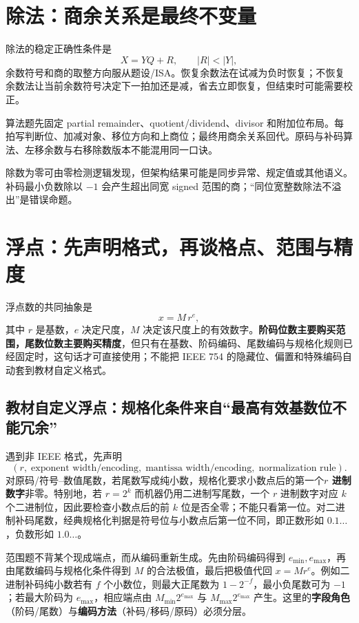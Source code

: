 \documentclass[UTF8,fontset=fandol,11pt,a4paper]{ctexart}
\newcommand{\kw}[1]{\textbf{\color{deep}#1}}
\begin{document}
\begin{center}

\end{center}

\section{除法：商余关系是最终不变量}
除法的稳定正确性条件是
\[
X=YQ+R,\qquad |R|<|Y|,
\]
余数符号和商的取整方向服从题设/ISA。恢复余数法在试减为负时恢复；不恢复余数法让当前余数符号决定下一拍加还是减，省去立即恢复，但结束时可能需要校正。

算法题先固定 partial remainder、quotient/dividend、divisor 和附加位布局。每拍写判断位、加减对象、移位方向和上商位；最终用商余关系回代。原码与补码算法、左移余数与右移除数版本不能混用同一口诀。

除数为零可由零检测逻辑发现，但架构结果可能是同步异常、规定值或其他语义。补码最小负数除以 $-1$ 会产生超出同宽 signed 范围的商；“同位宽整数除法不溢出”是错误命题。

\section{浮点：先声明格式，再谈格点、范围与精度}
浮点数的共同抽象是
\[
x=M\,r^e,
\]
其中 $r$ 是基数，$e$ 决定尺度，$M$ 决定该尺度上的有效数字。\kw{阶码位数主要购买范围，尾数位数主要购买精度}，但只有在基数、阶码编码、尾数编码与规格化规则已经固定时，这句话才可直接使用；不能把 IEEE 754 的隐藏位、偏置和特殊编码自动套到教材自定义格式。

\subsection{教材自定义浮点：规格化条件来自“最高有效基数位不能冗余”}
遇到非 IEEE 格式，先声明
\[
(r,\;\text{exponent width/encoding},\;\text{mantissa width/encoding},\;\text{normalization rule}).
\]
对原码/符号--数值尾数，若尾数写成纯小数，规格化要求小数点后的第一个\textbf{$r$ 进制数字}非零。特别地，若 $r=2^k$ 而机器仍用二进制写尾数，一个 $r$ 进制数字对应 $k$ 个二进制位，因此要检查小数点后的前 $k$ 位是否全零；不能只看第一位。对二进制补码尾数，经典规格化判据是符号位与小数点后第一位不同，即正数形如 $0.1\ldots$，负数形如 $1.0\ldots$。

范围题不背某个现成端点，而从编码重新生成。先由阶码编码得到 $e_{\min},e_{\max}$，再由尾数编码与规格化条件得到 $M$ 的合法极值，最后把极值代回 $x=M r^e$。例如二进制补码纯小数若有 $f$ 个小数位，则最大正尾数为 $1-2^{-f}$，最小负尾数可为 $-1$；若最大阶码为 $e_{\max}$，相应端点由 $M_{\min}2^{e_{\max}}$ 与 $M_{\max}2^{e_{\max}}$ 产生。这里的\textbf{字段角色}（阶码/尾数）与\textbf{编码方法}（补码/移码/原码）必须分层。
\end{document}
